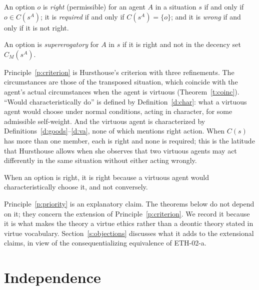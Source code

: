 \documentclass{situationist-preprint}
\newcommand{\Ch}{C}
\begin{document}
\begin{principle}\label{p:criterion}
An option $o$ is \emph{right} (permissible) for an agent $A$ in a situation $s$ if and only if $o\in\Ch(s^A)$; it is \emph{required} if and only if $\Ch(s^A)=\{o\}$; and it is \emph{wrong} if and only if it is not right.
\end{principle}

\begin{definition}[Supererogation]\label{d:sup}
An option is \emph{supererogatory} for $A$ in $s$ if it is right and not in the decency set $\Ch_M(s^A)$.
\end{definition}

\begin{remark}\label{r:hursthouse}
Principle~\ref{p:criterion} is Hursthouse's criterion with three refinements. The circumstances are those of the transposed situation, which coincide with the agent's actual circumstances when the agent is virtuous (Theorem~\ref{t:coinc}). \enquote{Would characteristically do} is defined by Definition~\ref{d:char}: what a virtuous agent would choose under normal conditions, acting in character, for some admissible self-weight. And the virtuous agent is characterized by Definitions~\ref{d:goods}--\ref{d:va}, none of which mentions right action. When $\Ch(s)$ has more than one member, each is right and none is required; this is the latitude that Hursthouse allows when she observes that two virtuous agents may act differently in the same situation without either acting wrongly.
\end{remark}

\begin{principle}\label{p:priority}
When an option is right, it is right because a virtuous agent would characteristically choose it, and not conversely.
\end{principle}

Principle~\ref{p:priority} is an explanatory claim. The theorems below do not depend on it; they concern the extension of Principle~\ref{p:criterion}. We record it because it is what makes the theory a virtue ethics rather than a deontic theory stated in virtue vocabulary. Section~\ref{s:objections} discusses what it adds to the extensional claims, in view of the consequentializing equivalence of ETH-02-a.

\section{Independence}\label{s:independence}
\end{document}
